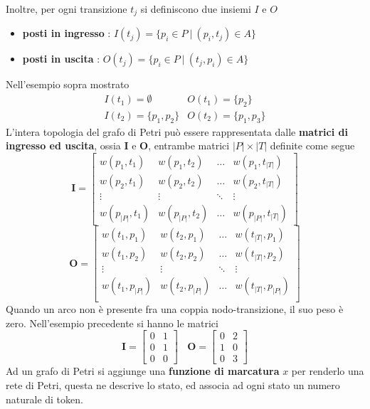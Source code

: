 \documentclass[10pt, letterpaper]{report}
\begin{document}
Inoltre, per ogni transizione $t_j$ si definiscono due insiemi $I$ e $O$ \begin{itemize}
    \item \textbf{posti in ingresso} : $I(t_j)=\{p_i\in P \ | \ (p_i,t_j)\in A\}$
    \item \textbf{posti in uscita} : $O(t_j)=\{p_i\in P \ | \ (t_j,p_i)\in A\}$
\end{itemize}
Nell'esempio sopra mostrato $$\begin{matrix}
    I(t_1)=\emptyset & O(t_1)=\{p_2\}\\ 
    I(t_2)=\{p_1,p_2\} & O(t_2)=\{p_1,p_3\}
\end{matrix} $$
L'intera topologia del grafo di Petri può essere rappresentata dalle \textbf{matrici di ingresso ed uscita}, ossia $\mathbf I$ e $ \mathbf O$, entrambe matrici $|P|\times |T|$ definite come segue 
$$ \mathbf I =\begin{bmatrix}
    w(p_1,t_1) & w(p_1, t_2) &\dots & w(p_1,t_{|T|})\\
    w(p_2,t_1) & w(p_2, t_2) &\dots & w(p_2,t_{|T|})\\
    \vdots & \vdots & \ddots & \vdots \\ 
    w(p_{|P|},t_1) & w(p_{|P|}, t_2) &\dots & w(p_{|P|},t_{|T|})
\end{bmatrix}$$
$$ \mathbf O =\begin{bmatrix}
    w(t_1,p_1) & w(t_2, p_1) &\dots & w(t_{|T|},p_1)\\
    w(t_1,p_2) & w(t_2, p_2) &\dots & w(t_{|T|},p_2)\\
    \vdots & \vdots & \ddots & \vdots \\ 
    w(t_1,p_{|P|}) & w(t_2, p_{|P|}) &\dots & w(t_{|T|},p_{|P|})\\
\end{bmatrix}$$
Quando un arco non è presente fra una coppia nodo-transizione, il suo peso è zero. Nell'esempio precedente si hanno le matrici 
$$ \mathbf I = \begin{bmatrix}
    0 & 1 \\ 0 & 1 \\ 0 & 0
\end{bmatrix} \ \ \ \ 
\mathbf O = \begin{bmatrix}
    0 & 2 \\ 1 & 0 \\ 0 & 3
\end{bmatrix}$$
Ad un grafo di Petri si aggiunge una \textbf{funzione di marcatura} $x$ per renderlo una rete di Petri, questa ne descrive lo stato, ed associa ad ogni stato un numero naturale di token. 
\end{document}
